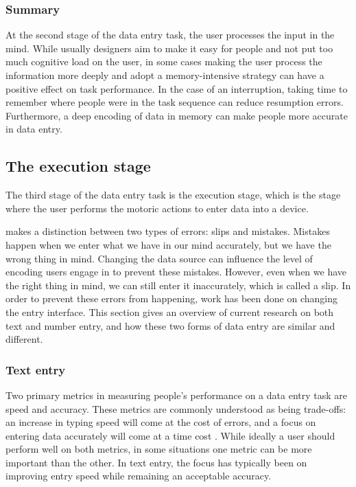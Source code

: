 \subsubsection{Summary}
At the second stage of the data entry task, the user processes the input in the mind. While usually designers aim to make it easy for people and not put too much cognitive load on the user, in some cases making the user process the information more deeply and adopt a memory-intensive strategy can have a positive effect on task performance. In the case of an interruption, taking time to remember where people were in the task sequence can reduce resumption errors. Furthermore, a deep encoding of data in memory can make people more accurate in data entry.

\subsection{The execution stage}
The third stage of the data entry task is the execution stage, which is the stage where the user performs the motoric actions to enter data into a device.

\citet{Reason1990} makes a distinction between two types of errors: slips and mistakes. Mistakes happen when we enter what we have in our mind accurately, but we have the wrong thing in mind. Changing the data source can influence the level of encoding users engage in to prevent these mistakes. However, even when we have the right thing in mind, we can still enter it inaccurately, which is called a slip. In order to prevent these errors from happening, work has been done on changing the entry interface. This section gives an overview of current research on both text and number entry, and how these two forms of data entry are similar and different.

\subsubsection{Text entry}
Two primary metrics in measuring people's performance on a data entry task are speed and accuracy. These metrics are commonly understood as being trade-offs: an increase in typing speed will come at the cost of errors, and a focus on entering data accurately will come at a time cost \citep{MacKenzie2002, Smith2008}.  While ideally a user should perform well on both metrics, in some situations one metric can be more important than the other. In text entry, the focus has typically been on improving entry speed while remaining an acceptable accuracy.

